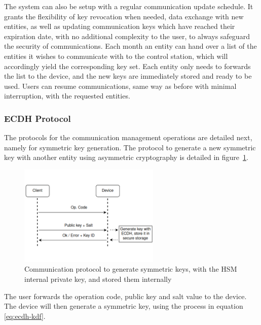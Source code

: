 The system can also be setup with a regular communication update schedule. It grants the flexibility of key revocation when needed, data exchange with new entities, as well as updating communication keys which have reached their expiration date, with no additional complexity to the user, to always safeguard the security of communications.
Each month an entity can hand over a list of the entities it wishes to communicate with to the control station, which will accordingly yield the corresponding key set.
Each entity only needs to forwards the list to the device, and the new keys are immediately stored and ready to be used.
Users can resume communications, same way as before with minimal interruption, with the requested entities.

\subsubsection{ECDH Protocol}\label{chap:arch:services:new-comms:ecdh}

The protocols for the communication management operations are detailed next, namely for symmetric key generation. The protocol to generate a new symmetric key with another entity using asymmetric cryptography is detailed in figure~\ref{fig:protocol:ecdh}.

\begin{figure}[h!]
	\centering
	\includegraphics[width=0.60\textwidth]{./Images/ecdh.png}
	\caption{Communication protocol to generate symmetric keys, with the HSM internal private key, and stored them internally}
	\label{fig:protocol:ecdh}
\end{figure}

The user forwards the operation code, public key and salt value to the device.
The device will then generate a symmetric key, using the process in equation \ref{eq:ecdh-kdf}.

